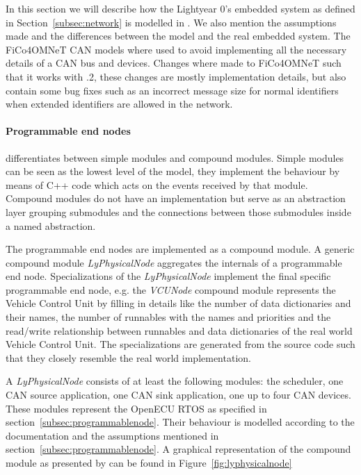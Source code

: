 \label{subsec:moddeling}
In this section we will describe how the Lightyear 0's embedded system as defined in Section~\ref{subsec:network} is modelled in \omnet. We also mention the assumptions made and the differences between the model and the real embedded system. The FiCo4OMNeT CAN models where used to avoid implementing all the necessary details of a CAN bus and devices. Changes where made to FiCo4OMNeT such that it works with .2, these changes are mostly implementation details, but also contain some bug fixes such as an incorrect message size for normal identifiers when extended identifiers are allowed in the network.

\paragraph{Programmable end nodes} \omnet differentiates between simple modules and compound modules. Simple modules can be seen as the lowest level of the model, they implement the behaviour by means of C++ code which acts on the events received by that module. Compound modules do not have an implementation but serve as an abstraction layer grouping submodules and the connections between those submodules inside a named abstraction.

The programmable end nodes are implemented as a compound module. A generic compound module \textit{LyPhysicalNode} aggregates the internals of a programmable end node. Specializations of the \textit{LyPhysicalNode} implement the final specific programmable end node, e.g. the \textit{VCUNode} compound module represents the Vehicle Control Unit by filling in details like the number of data dictionaries and their names, the number of runnables with the names and priorities and the read/write relationship between runnables and data dictionaries of the real world Vehicle Control Unit. The specializations are generated from the source code such that they closely resemble the real world implementation. 

A \textit{LyPhysicalNode} consists of at least the following modules: the scheduler, one CAN source application, one CAN sink application, one up to four CAN devices. These modules represent the OpenECU RTOS as specified in section~\ref{subsec:programmablenode}. Their behaviour is modelled according to the documentation and the assumptions mentioned in section~\ref{subsec:programmablenode}. A graphical representation of the compound module as presented by \omnet can be found in Figure~\ref{fig:lyphysicalnode}

